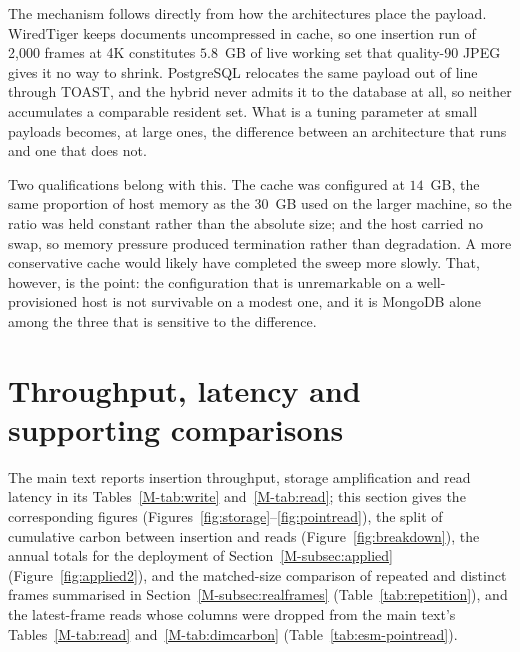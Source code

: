 \documentclass[11pt]{article}
\begin{document}
The mechanism follows directly from how the architectures place the payload. WiredTiger keeps documents uncompressed in cache, so one insertion run of 2{,}000 frames at 4K constitutes $5.8$~GB of live working set that quality-90 JPEG gives it no way to shrink. PostgreSQL relocates the same payload out of line through TOAST, and the hybrid never admits it to the database at all, so neither accumulates a comparable resident set. What is a tuning parameter at small payloads becomes, at large ones, the difference between an architecture that runs and one that does not.

Two qualifications belong with this. The cache was configured at $14$~GB, the same proportion of host memory as the $30$~GB used on the larger machine, so the ratio was held constant rather than the absolute size; and the host carried no swap, so memory pressure produced termination rather than degradation. A more conservative cache would likely have completed the sweep more slowly. That, however, is the point: the configuration that is unremarkable on a well-provisioned host is not survivable on a modest one, and it is MongoDB alone among the three that is sensitive to the difference.


\section{Throughput, latency and supporting comparisons}\label{sec:esm-perf}
The main text reports insertion throughput, storage amplification and read latency in its Tables~\ref{M-tab:write} and~\ref{M-tab:read}; this section gives the corresponding figures (Figures~\ref{fig:storage}--\ref{fig:pointread}), the split of cumulative carbon between insertion and reads (Figure~\ref{fig:breakdown}), the annual totals for the deployment of Section~\ref{M-subsec:applied} (Figure~\ref{fig:applied2}), and the matched-size comparison of repeated and distinct frames summarised in Section~\ref{M-subsec:realframes} (Table~\ref{tab:repetition}), and the latest-frame reads whose columns were dropped from the main text's Tables~\ref{M-tab:read} and~\ref{M-tab:dimcarbon} (Table~\ref{tab:esm-pointread}).
\end{document}
